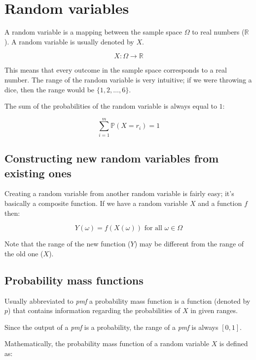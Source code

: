 \section{Random variables}

A random variable is a mapping between the sample space $\Omega$ to real numbers
($\mathbb{R}$). A random variable is usually denoted by $X$.

\begin{dmath*}
	X : \Omega \rightarrow \mathbb{R}
\end{dmath*}

This means that every outcome in the sample space corresponds to a real number.
The range of the random variable is very intuitive; if we were throwing a dice,
then the range would be $\{1, 2, \dots, 6\}$.

The sum of the probabilities of the random variable is always equal to $1$:

\begin{dmath*}
	\sum\limits_{i=1}^m\mathbb{P}(X=r_i) = 1
\end{dmath*}

\subsection{Constructing new random variables from existing ones}
\label{subsec:new_random_vars}
Creating a random variable from another random variable is fairly easy; it's
basically a composite function. If we have a random variable $X$ and a function
$f$ then:

\begin{dmath*}
	Y(\omega) = f(X(\omega)) \textrm{ for all $\omega \in \Omega$}
\end{dmath*}

Note that the range of the new function ($Y$) may be different from the range of
the old one ($X$).

\subsection{Probability mass functions}

Usually abbreviated to {\it pmf} a probability mass function is a function
(denoted by $p$) that contains information regarding the probabilities of $X$ in
given ranges.

Since the output of a {\it pmf} is a probability, the range of a {\it pmf} is
always $[0,1]$.

Mathematically, the probability mass function of a random variable $X$ is
defined as:

